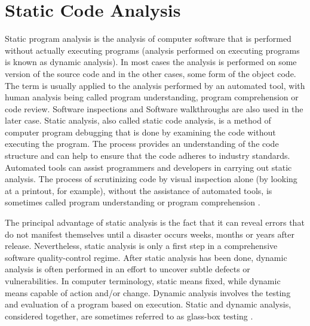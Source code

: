 \section{Static Code Analysis}

Static program analysis is the analysis of computer software that is performed without actually executing programs (analysis performed on executing programs is known as dynamic analysis). In most cases the analysis is performed on some version of the source code and in the other cases, some form of the object code. The term is usually applied to the analysis performed by an automated tool, with human analysis being called program understanding, program comprehension or code review. Software inspections and Software walkthroughs are also used in the later case. Static analysis, also called static code analysis, is a method of computer program debugging that is done by examining the code without executing the program. The process provides an understanding of the code structure and can help to ensure that the code adheres to industry standards. Automated tools can assist programmers and developers in carrying out static analysis. The process of scrutinizing code by visual inspection alone (by looking at a printout, for example), without the assistance of automated tools, is sometimes called program understanding or program comprehension \cite{ref_86_techtarget:techtarget}.

The principal advantage of static analysis is the fact that it can reveal errors that do not manifest themselves until a disaster occurs weeks, months or years after release. Nevertheless, static analysis is only a first step in a comprehensive software quality-control regime. After static analysis has been done, dynamic analysis is often performed in an effort to uncover subtle defects or vulnerabilities. In computer terminology, static means fixed, while dynamic means capable of action and/or change. Dynamic analysis involves the testing and evaluation of a program based on execution. Static and dynamic analysis, considered together, are sometimes referred to as glass-box testing \cite{ref_86_techtarget:techtarget}.

